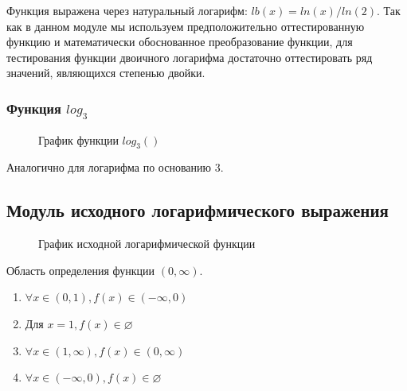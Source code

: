 \documentclass[a4paper,10pt]{article}
\begin{document}
    		Функция выражена через натуральный логарифм: $lb(x) = ln(x)/ln(2)$.
    		Так как в данном модуле мы используем предположительно оттестированную функцию и математически обоснованное
    		преобразование функции, для тестирования функции двоичного логарифма достаточно оттестировать ряд значений,
    		являющихся степенью двойки.
		\subsubsection*{Функция $log_3$}

		\begin{figure}[h!]
			\caption{График функции $log_3()$}
		\end{figure}
		Аналогично для логарифма по основанию 3.

    \subsection*{Модуль исходного логарифмического выражения}
		
		\begin{figure}[h!]
			\caption{График исходной логарифмической функции}
		\end{figure}

		Область определения функции $(0, \infty)$. 
		\begin{enumerate}
			\item $\forall x \in (0, 1), f(x) \in (-\infty, 0)$
			\item $\text{Для } x = 1, f(x) \in \varnothing$
			\item $\forall x \in (1, \infty), f(x) \in (0, \infty)$
			\item $\forall x \in (-\infty, 0), f(x) \in \varnothing$
		\end{enumerate}
\end{document}
